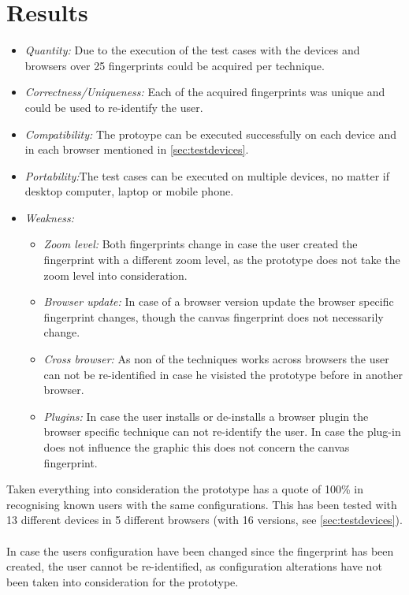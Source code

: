 \section{Results}
\begin{itemize}
	\item \textit{Quantity: }Due to the execution of the test cases with the devices and browsers over 25 fingerprints could be acquired per technique.
	\item \textit{Correctness/Uniqueness: }Each of the acquired fingerprints was unique and could be used to re-identify the user.
	\item \textit{Compatibility: }The protoype can be executed successfully on each device and in each browser mentioned in \autoref{sec:testdevices}. 
	\item \textit{Portability:}The test cases can be executed on multiple devices, no matter if desktop computer, laptop or mobile phone.
	\item \textit{Weakness: }
	\begin{itemize}
		\item \textit{Zoom level: }Both fingerprints change in case the user created the fingerprint with a different zoom level, as the prototype does not take the zoom level into consideration. 
		\item \textit{Browser update: }In case of a browser version update the browser specific fingerprint changes, though the canvas fingerprint does not necessarily change.
		\item \textit{Cross browser: }As non of the techniques works across browsers the user can not be re-identified in case he visisted the prototype before in another browser.
		\item \textit{Plugins: }In case the user installs or de-installs a browser plugin the browser specific technique can not re-identify the user. In case the plug-in does not influence the graphic this does not concern the canvas fingerprint.\\
	\end{itemize}
\end{itemize}
Taken everything into consideration the prototype has a quote of 100\% in recognising known users with the same configurations. This has been tested with 13 different devices in 5 different browsers (with 16 versions, see \autoref{sec:testdevices}).\\\\
In case the users configuration have been changed since the fingerprint has been created, the user cannot be re-identified, as configuration alterations have not been taken into consideration for the prototype.


